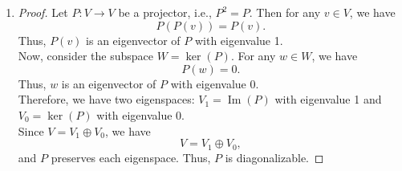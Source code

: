 \documentclass{article}
\begin{document}
\begin{enumerate}
\begin{proof}
        \[
        V = \bigoplus_{i=1}^k V_{\lambda_i}.
        \]
        For each $i$, $T$ preserves $V_{\lambda_i}$, and $T|_{V_{\lambda_i}} = \lambda_i Id_{V_{\lambda_i}}$. \\
        Thus, $T$ is diagonalizable.
    \end{proof}
    \item \begin{proof}
        Let $P: V \to V$ be a projector, i.e., $P^2 = P$. Then for any $v \in V$, we have
        \[
        P(P(v)) = P(v).
        \]
        Thus, $P(v)$ is an eigenvector of $P$ with eigenvalue 1. \\
        Now, consider the subspace $W = \ker(P)$. For any $w \in W$, we have
        \[
        P(w) = 0.
        \]
        Thus, $w$ is an eigenvector of $P$ with eigenvalue 0. \\
        Therefore, we have two eigenspaces: $V_1 = \operatorname{Im}(P)$ with eigenvalue 1 and $V_0 = \ker(P)$ with eigenvalue 0. \\
        Since $V = V_1 \oplus V_0$, we have
        \[
        V = V_1 \oplus V_0,
        \]
        and $P$ preserves each eigenspace. Thus, $P$ is diagonalizable.
    \end{proof}
\end{enumerate}
\end{document}
